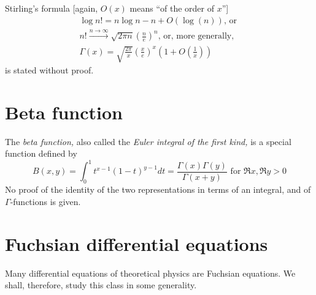 
Stirling's formula\cite{Namias-1986}
[again, $O(x)$ means ``of the order of $x$'']
\begin{equation}
\begin{split}
\log n! = n \log n -n + O(\log (n))\textrm{, or }   \\
n! \stackrel{n\rightarrow \infty}{\longrightarrow} \sqrt{2\pi n} \left(\frac{n}{e}\right)^n
\textrm{, or, more generally, }\\
\Gamma (x) = \sqrt{\frac{2\pi }{x}}\left(\frac{x}{e}\right)^x \left( 1+ O\left(\frac{1}{x}\right) \right)
\end{split}
\end{equation}
is stated without proof.

\section{Beta function}
The  {\em beta function,}
also called the  {\em Euler integral of the first kind,} is a special function defined by
\begin{equation}
B(x,y)=\int_0^1 t^{x-1}(1-t)^{y-1} dt =\frac{\Gamma (x) \Gamma (y)}{\Gamma (x+y)} \textrm{ for } \Re x, \Re y >0
\label{2011-m-ch-sf-beta}
\end{equation}
No proof of the identity of the two representations in terms of an integral, and of $\Gamma$-functions is given.


\section{Fuchsian differential equations}

Many differential equations of theoretical physics are Fuchsian equations.
We shall, therefore, study this class in some generality.


